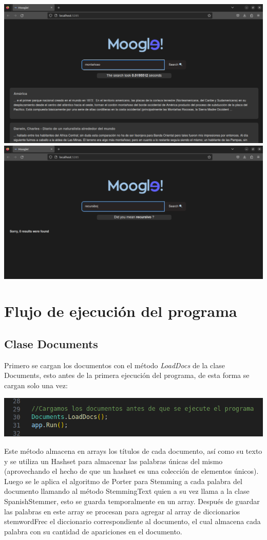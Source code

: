 \documentclass{article}
\begin{document}
\vspace{0.5cm}
\includegraphics[width=0.5\linewidth]{busqueda.png}
\includegraphics[width=0.5\linewidth]{sugerencia.png}

\section{Flujo de ejecución del programa}
\subsection{Clase Documents}

Primero se cargan los documentos con el método \textit{LoadDocs} de la clase Documents, esto antes de la primera ejecución del programa, de esta forma se cargan solo una vez:

\vspace{0.5cm}
\includegraphics[width=0.5\linewidth]{cargardocs.png}
\vspace{0.5cm}

Este método almacena en arrays los títulos de cada documento, así como su texto y se utiliza un Hashset para almacenar las palabras únicas del mismo (aprovechando el hecho de que un hashset es una colección de elementos únicos). Luego se le aplica el algoritmo de Porter para Stemming a cada palabra del documento llamando al método StemmingText quien a su vez llama a la clase SpanishStemmer, esto se guarda temporalmente en un array. Después de guardar las palabras en este array se procesan para agregar al array de diccionarios stemwordFrec el diccionario correspondiente al documento, el cual almacena cada palabra con su cantidad de apariciones en el documento.
\end{document}
